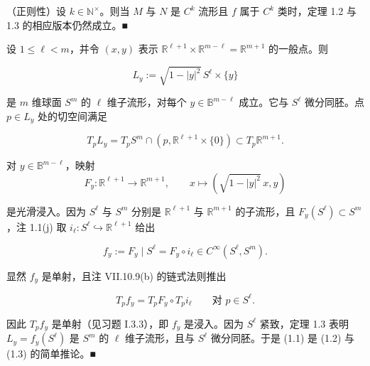 \begin{remark}

（正则性）设 $ k\in\mathbb{N}^\times $。则当 $ M $ 与 $ N $ 是 $ C^k $ 流形且 $ f $ 属于 $ C^k $ 类时，定理 1.2 与 1.3 的相应版本仍然成立。\nobreak\hspace{0.35em}■

\end{remark}

\begin{example}

\begin{items}
\item

设 $ 1\le\ell<m $，并令 $ (x,y) $ 表示 $ \mathbb{R}^{\ell+1}\times\mathbb{R}^{m-\ell}=\mathbb{R}^{m+1} $ 的一般点。则

\[
L_y:=\sqrt{1-|y|^2}\,S^\ell\times\{y\}
\]

是 $ m $ 维球面 $ S^m $ 的 $ \ell $ 维子流形，对每个 $ y\in\mathbb{B}^{m-\ell} $ 成立。它与 $ S^\ell $ 微分同胚。点 $ p\in L_y $ 处的切空间满足

\begin{equation}
T_p L_y=T_p S^m\cap(p,\mathbb{R}^{\ell+1}\times\{0\})\subset T_p\mathbb{R}^{m+1}.\tag{1.1}
\end{equation}
\end{items}


\proofhead
对 $ y\in\mathbb{B}^{m-\ell} $，映射
\begin{equation}
F_y:\mathbb{R}^{\ell+1}\to\mathbb{R}^{m+1},\qquad x\mapsto(\sqrt{1-|y|^2}\,x,y)\tag{1.2}
\end{equation}

是光滑浸入。因为 $ S^\ell $ 与 $ S^m $ 分别是 $ \mathbb{R}^{\ell+1} $ 与 $ \mathbb{R}^{m+1} $ 的子流形，且 $ F_y(S^\ell)\subset S^m $，注 1.1(j) 取 $ i_\ell:S^\ell\hookrightarrow\mathbb{R}^{\ell+1} $ 给出

\begin{equation}
f_y:=F_y\mid S^\ell=F_y\circ i_\ell\in C^\infty(S^\ell,S^m).\tag{1.3}
\end{equation}

显然 $ f_y $ 是单射，且注 VII.10.9(b) 的链式法则推出

\[
T_p f_y=T_p F_y\circ T_p i_\ell\qquad \text{对 } p\in S^\ell.
\]

因此 $ T_p f_y $ 是单射（见习题 I.3.3），即 $ f_y $ 是浸入。因为 $ S^\ell $ 紧致，定理 1.3 表明 $ L_y=f_y(S^\ell) $ 是 $ S^m $ 的 $ \ell $ 维子流形，且与 $ S^\ell $ 微分同胚。于是 (1.1) 是 (1.2) 与 (1.3) 的简单推论。\nobreak\hspace{0.35em}■


\end{example}
